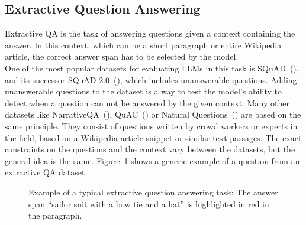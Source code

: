 \subsection{Extractive Question Answering}\label{sec:extractive-qa}
Extractive QA is the task of answering questions given a context containing the answer.
In this context, which can be a short paragraph or entire Wikipedia article, the correct answer span has to be selected by the model.
\\
One of the most popular datasets for evaluating LLMs in this task is SQuAD~(\cite{rajpurkar:2016:SQuAD}), and its successor SQuAD 2.0~(\cite{rajpurkar:2018:Know}), which includes unanswerable questions.
Adding unanswerable questions to the dataset is a way to test the model's ability to detect when a question can not be answered by the given context.
Many other datasets like NarrativeQA~(\cite{kovcisky:2018:The}), QuAC~(\cite{choi:2018:QuAC}) or Natural Questions~(\cite{kwiatkowski:2019:Natural}) are based on the same principle.
They consist of questions written by crowd workers or experts in the field, based on a Wikipedia article snippet or similar text passages.
The exact constraints on the questions and the context vary between the datasets, but the general idea is the same.
Figure~\ref{fig:extractive_qa_example} shows a generic example of a question from an extractive QA dataset.
\begin{figure}[tb]
    \centering
    \caption{Example of a typical extractive question answering task: The answer span ``sailor suit with a bow tie and a hat'' is highlighted in red in the paragraph.}
    \label{fig:extractive_qa_example}
\end{figure}
